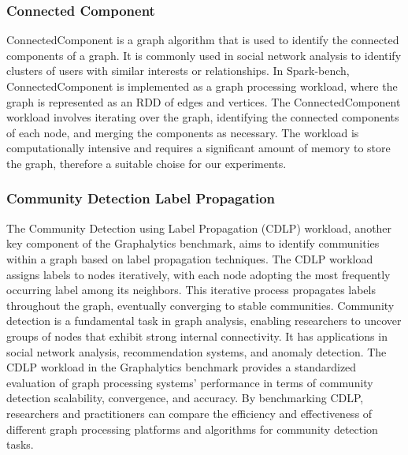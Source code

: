 \subsubsection{Connected Component}
ConnectedComponent is a graph algorithm that is used to identify the
connected components of a graph. It is commonly used in social network
analysis to identify clusters of users with similar interests or
relationships. In Spark-bench, ConnectedComponent is implemented as a
graph processing workload, where the graph is represented as an RDD of
edges and vertices. The ConnectedComponent workload involves iterating
over the graph, identifying the connected components of each node, and
merging the components as necessary. The workload is computationally
intensive and requires a significant amount of memory to store the
graph, therefore a suitable choise for our experiments.

\subsubsection{Community Detection Label Propagation}
The Community Detection using Label Propagation (CDLP) workload, another key component of the Graphalytics benchmark, aims to identify communities within a graph based on label propagation techniques. The CDLP workload assigns labels to nodes iteratively, with each node adopting the most frequently occurring label among its neighbors. This iterative process propagates labels throughout the graph, eventually converging to stable communities. Community detection is a fundamental task in graph analysis, enabling researchers to uncover groups of nodes that exhibit strong internal connectivity. It has applications in social network analysis, recommendation systems, and anomaly detection. The CDLP workload in the Graphalytics benchmark provides a standardized evaluation of graph processing systems' performance in terms of community detection scalability, convergence, and accuracy. By benchmarking CDLP, researchers and practitioners can compare the efficiency and effectiveness of different graph processing platforms and algorithms for community detection tasks.

